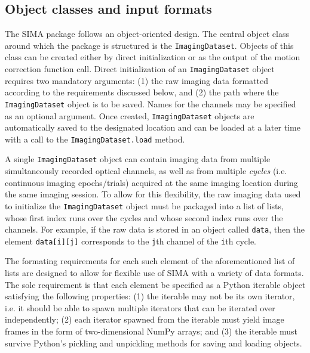 \subsection{Object classes and input formats}
\label{sec:sima:inputs}
The SIMA package follows an object-oriented design.
The central object class around which the package is structured is the \verb|ImagingDataset|.
Objects of this class can be created either by direct initialization
or as the output of the motion correction function call.
Direct initialization of an \verb|ImagingDataset| object requires two mandatory arguments:
(1) the raw imaging data formatted according to the requirements discussed below, 
and (2) the path where the \verb|ImagingDataset| object is to be saved.
Names for the channels may be specified as an optional argument.
Once created, \verb|ImagingDataset| objects are automatically saved to the
designated location and can be loaded at a later time with
a call to the \verb|ImagingDataset.load| method.

A single \verb|ImagingDataset| object can contain imaging data from multiple
simultaneously recorded optical channels, as well as from multiple \textit{cycles} 
(i.e. continuous imaging epochs/trials) acquired at the same imaging location
during the same imaging session.
To allow for this flexibility, the raw imaging data used to initialize the
\verb|ImagingDataset| object must be packaged into a list of lists,
whose first index runs over the cycles and whose second index runs over the
channels.
For example, if the raw data is stored in an object called \verb|data|,
then the element \verb|data[i][j]| corresponds to the \verb|j|th channel of the
\verb|i|th cycle.

The formating requirements for each such element of the aforementioned list of lists
are designed to allow for flexible use of SIMA with
a variety of data formats.
The sole requirement is that each element be specified as a Python iterable
object satisfying the following properties: 
(1) the iterable may not be its own iterator, i.e. it should be able to spawn
multiple iterators that can be iterated over independently;
(2) each iterator spawned from the iterable must yield image frames in the form
of two-dimensional NumPy arrays;
and (3) the iterable must survive Python's pickling and unpickling methods
for saving and loading objects.

